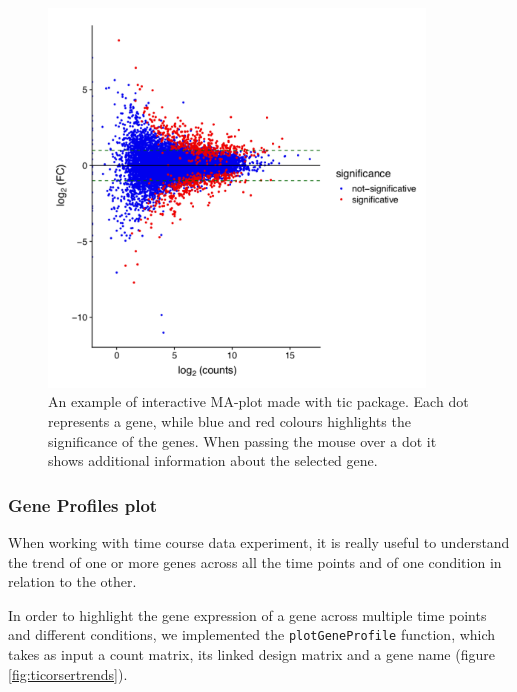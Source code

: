 \begin{figure}[H]
\centering
\includegraphics[width=10cm,keepaspectratio]{img/ticorser/maplot.pdf}
\caption[ticorser MAplot]{An example of interactive MA-plot made with \gls{tic} package. Each dot represents a gene, while blue and red colours highlights the significance of the genes. When passing the mouse over a dot it shows additional information about the selected gene.}
\label{fig:ticorsermaplot}
\end{figure}


\subsubsection{Gene Profiles plot}
When working with time course data experiment, it is really useful to understand the trend of one or more genes across all the time points and of one condition in relation to the other.

In order to highlight the gene expression of a gene across multiple time points and different conditions, we implemented the \lstinline!plotGeneProfile! function, which takes as input a count matrix, its linked design matrix and a gene name (figure \ref{fig:ticorsertrends}).

